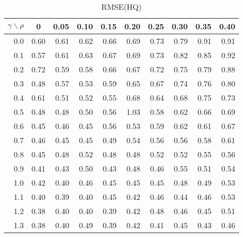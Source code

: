 \documentclass[12pt]{article}
\begin{document}
\begin{table}[!tbp]
\caption{RMSE(HQ)}
 \begin{center}
 \begin{tabular}{r|rrrrrrrrr}\hline\hline
\multicolumn{1}{c|}{$\gamma\backslash\rho$}&\multicolumn{1}{c}{0}&\multicolumn{1}{c}{0.05}&\multicolumn{1}{c}{0.10}&\multicolumn{1}{c}{0.15}&\multicolumn{1}{c}{0.20}&\multicolumn{1}{c}{0.25}&\multicolumn{1}{c}{0.30}&\multicolumn{1}{c}{0.35}&\multicolumn{1}{c}{0.40}\tabularnewline
\hline


0.0&0.60&0.61&0.62&0.66&0.69&0.73&0.79&0.91&0.91\tabularnewline
0.1&0.57&0.61&0.63&0.67&0.69&0.73&0.82&0.85&0.92\tabularnewline
0.2&0.72&0.59&0.58&0.66&0.67&0.72&0.75&0.79&0.88\tabularnewline
0.3&0.48&0.57&0.53&0.59&0.65&0.67&0.74&0.76&0.80\tabularnewline
0.4&0.61&0.51&0.52&0.55&0.68&0.64&0.68&0.75&0.73\tabularnewline
0.5&0.48&0.48&0.50&0.56&1.03&0.58&0.62&0.66&0.69\tabularnewline
0.6&0.45&0.46&0.45&0.56&0.53&0.59&0.62&0.61&0.67\tabularnewline
0.7&0.46&0.45&0.45&0.49&0.54&0.56&0.56&0.58&0.61\tabularnewline
0.8&0.45&0.48&0.52&0.48&0.48&0.52&0.52&0.55&0.56\tabularnewline
0.9&0.41&0.43&0.50&0.43&0.48&0.46&0.55&0.51&0.54\tabularnewline
1.0&0.42&0.40&0.46&0.45&0.45&0.45&0.48&0.49&0.53\tabularnewline
1.1&0.40&0.39&0.40&0.45&0.42&0.46&0.44&0.46&0.53\tabularnewline
1.2&0.38&0.40&0.40&0.39&0.42&0.48&0.46&0.45&0.51\tabularnewline
1.3&0.38&0.40&0.49&0.39&0.42&0.41&0.45&0.43&0.46\tabularnewline
\hline
\end{tabular}

\end{center}

\end{table}

%
\end{document}
